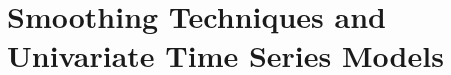 \chapter{Smoothing Techniques and Univariate Time Series Models}
\label{ch:smoothing_and_univariate_models}

